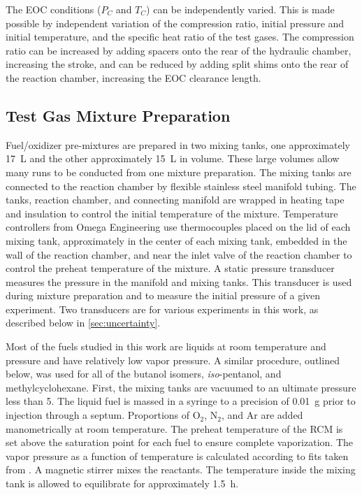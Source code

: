 \documentclass[../main.tex]{subfiles}
\begin{document}
The EOC conditions ($P_C$ and $T_C$) can be independently varied. This
is made possible by independent variation of the compression ratio,
initial pressure and initial temperature, and the specific heat ratio
of the test gases. The compression ratio can be
increased by adding spacers onto the rear of the hydraulic chamber,
increasing the stroke, and can be reduced by adding split shims onto
the rear of the reaction chamber, increasing the EOC clearance length.

\subsection{Test Gas Mixture Preparation}

Fuel/oxidizer pre-mixtures are prepared in two mixing tanks, one approximately
\SI{17}{\liter} and the other approximately \SI{15}{\liter} in volume. These large volumes allow many
runs to be conducted from one mixture preparation. The mixing tanks are connected
to the reaction chamber by flexible stainless steel manifold tubing. The tanks, reaction chamber,
and connecting manifold are wrapped in heating tape and insulation to control the initial
temperature of the mixture. Temperature controllers from Omega Engineering use thermocouples
placed on the lid of each mixing tank, approximately in the center of each mixing tank, embedded in
the wall of the reaction chamber, and near the inlet valve of the reaction chamber to control the
preheat temperature of the mixture. A static pressure transducer
measures the pressure in the manifold and mixing tanks. This transducer is used
during mixture preparation and to measure the initial pressure of a given experiment.
Two transducers are for various experiments in this work, as described below
in \autoref{sec:uncertainty}.

Most of the fuels studied in this work are liquids at room temperature and
pressure and have relatively low vapor pressure. A similar procedure, outlined
below, was used for all of the butanol isomers, \textit{iso}-pentanol, and
methylcyclohexane. First, the mixing tanks are vacuumed to an ultimate pressure
less than \SI{5}{\torr}. The liquid fuel is massed in a syringe to a precision of
\SI{0.01}{\gram} prior to injection through a septum. Proportions of O$_2$, N$_2$, and
Ar are added manometrically at room temperature. The preheat temperature of
the RCM is set above the saturation point for each fuel to ensure complete
vaporization. The vapor pressure as a function of temperature is calculated
according to fits taken from \textcite{Yaws1999}. A magnetic stirrer mixes
the reactants. The temperature inside the mixing tank is allowed to
equilibrate for approximately \SI{1.5}{\hour}.
\end{document}
